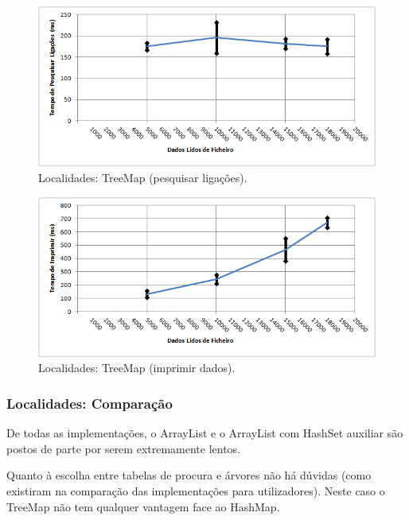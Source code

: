\documentclass[a5paper,twocolumn, 11pt]{article}
\begin{document}
\begin{figure}[h!b!t!]
    \caption[Localidades: TreeMap (pesquisar ligações)]{Localidades: TreeMap (pesquisar ligações).}
    \label{hashtable}
    \centering
        \includegraphics[width=400pt]{cloc_conf4_o4.png}
\end{figure}
\begin{figure}[h!b!t!]
    \caption[Localidades: TreeMap (imprimir dados)]{Localidades: TreeMap (imprimir dados).}
    \label{hashtable}
    \centering
        \includegraphics[width=400pt]{cloc_conf4_o5.png}
\end{figure}




\newpage
\twocolumn
\newpage

\subsubsection[Localidades:\\Comparação]{Localidades: Comparação}
De todas as implementações, o ArrayList e o ArrayList com HashSet auxiliar são postos de parte por serem extremamente lentos.

Quanto à escolha entre tabelas de procura e árvores não há dúvidas (como existiram na comparação das implementações para utilizadores). Neste caso o TreeMap não tem qualquer vantagem face ao HashMap.
\end{document}
